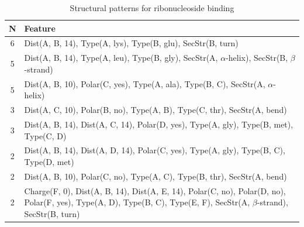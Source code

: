 \documentclass[11pt,twoside,a4paper]{book}
\begin{document}
\begin{table}\begin{tabularx}{\textwidth}{cX}\textbf{N} & \textbf{Feature} \\ \hline  
6 & Dist(A, B, 14),  Type(A, lys), Type(B, glu), SecStr(B, turn)\\ \hline 
5 & Dist(A, B, 14),  Type(A, leu), Type(B, gly), SecStr(A, $\alpha$-helix), SecStr(B, $\beta$-strand)\\ \hline 
5 & Dist(A, B, 10), Polar(C, yes),  Type(A, ala), Type(B, C), SecStr(A, $\alpha$-helix)\\ \hline 
3 & Dist(A, C, 10), Polar(B, no),  Type(A, B), Type(C, thr), SecStr(A, bend)\\ \hline 
3 & Dist(A, B, 14), Dist(A, C, 14), Polar(D, yes),  Type(A, gly), Type(B, met), \newline Type(C, D)\\ \hline 
2 & Dist(A, B, 14), Dist(A, D, 14), Polar(C, yes),  Type(A, gly), Type(B, C), \newline Type(D, met)\\ \hline 
2 & Dist(A, B, 10), Polar(C, no),  Type(A, C), Type(B, thr), SecStr(A, bend)\\ \hline 
2 & Charge(F, 0), Dist(A, B, 14), Dist(A, E, 14), Polar(C, no), Polar(D, no), \newline Polar(F, yes),  Type(A, D), Type(B, C), Type(E, F), SecStr(A, $\beta$-strand), \newline SecStr(B, turn)\\ \hline 
 \end{tabularx}\caption{Structural patterns for ribonucleoside binding}\label{tab:ribonucleoside_binding}\end{table}
\end{document}
